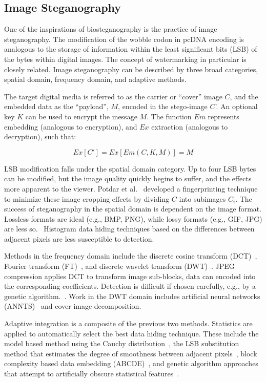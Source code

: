 \documentclass{bioinfo}
\begin{document}
\subsection{Image Steganography}

One of the inspirations of biosteganography is the practice of image steganography. The modification of the wobble codon in pcDNA encoding is analogous to the storage of information within the least significant bits (LSB) of the bytes within digital images. The concept of watermarking in particular is closely related. Image steganography can be described by three broad categories, spatial domain, frequency domain, and adaptive methods.

The target digital media is referred to as the carrier or ``cover'' image $C$, and the embedded data as the ``payload'', $M$, encoded in the stego-image $C$'. An optional key $K$ can be used to encrypt the message $M$. The function $Em$ represents embedding (analogous to encryption), and $Ex$ extraction (analogous to decryption), such that:

\[
	Ex[C'] = Ex[Em(C,K,M)] = M
\]

LSB modification falls under the spatial domain category. Up to four LSB bytes can be modified, but the image quality quickly begins to suffer, and the effects more apparent to the viewer. Potdar et al.~\cite{POTDAR2005} developed a fingerprinting technique to minimize these image cropping effects by dividing $C$ into subimages $C_i$. The success of steganography in the spatial domain is dependent on the image format. Lossless formats are ideal (e.g., BMP, PNG), while lossy formats (e.g., GIF, JPG) are less so.~\cite{JUNG2009} Histogram data hiding techniques based on the differences between adjacent pixels are less susceptible to detection.~\cite{LI2009}

Methods in the frequency domain include the discrete cosine transform (DCT)~\cite{MANIKOPOLOUS2002}, Fourier transform (FT)~\cite{MCKEON2007}, and discrete wavelet transform (DWT)~\cite{CHEN2007,POTDAR2005S,VERMA2005,ABDULAZIZ2000}. JPEG compression applies DCT to transform image sub-blocks, data can encoded into the corresponding coefficients. Detection is difficult if chosen carefully, e.g., by a genetic algorithm.~\cite{FARD2006}. Work in the DWT domain includes artificial neural networks (ANNTS)~\cite{PAULSON2006} and cover image decomposition.~\cite{ABDELWAHAB2008}

Adaptive integration is a composite of the previous two methods. Statistics are applied to automatically select the best data hiding technique. These include the model based method using the Cauchy distribution~\cite{SALLEE2003}, the LSB substitution method that estimates the degree of smoothness between adjacent pixels~\cite{CHANG2004}, block complexity based data embedding (ABCDE)~\cite{HIROHISA2002}, and genetic algorithm approaches that attempt to artificially obscure statistical features~\cite{WU2006GEN}.
\end{document}

